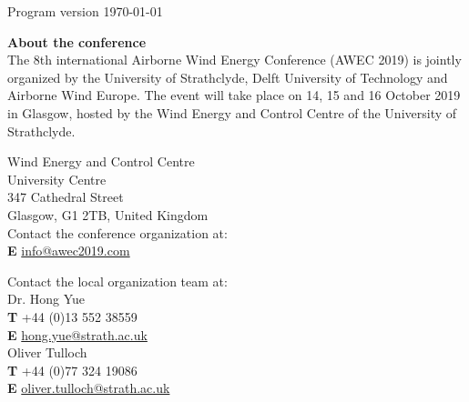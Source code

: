 \hfill Program version \today

\vspace{5.5cm}

\textbf{\Large About the conference}\\

The 8th international Airborne Wind Energy Conference (AWEC 2019) is jointly organized by the University of Strathclyde, Delft University of Technology and Airborne Wind Europe. The event will take place on 14, 15 and 16 October 2019 in Glasgow, hosted by the Wind Energy and Control Centre of the University of Strathclyde.

\begin{multicols}{2}
Wind Energy and Control Centre \\
University Centre \\
347 Cathedral Street\\
Glasgow, G1 2TB, United Kingdom\\[.2cm]

Contact the conference organization at: \\
\textbf{E} \href{mailto:info@awec2019.com}{info@awec2019.com}
\vfill

\columnbreak
Contact the local organization team at: \\
Dr. Hong Yue \\
\textbf{T} +44 (0)13 552 38559 \\
\textbf{E} \href{mailto:hong.yue@strath.ac.uk}{hong.yue@strath.ac.uk} \\[.2cm]

Oliver Tulloch \\
\textbf{T} +44 (0)77 324 19086 \\
\textbf{E} \href{mailto:oliver.tulloch@strath.ac.uk}{oliver.tulloch@strath.ac.uk}

\end{multicols}

